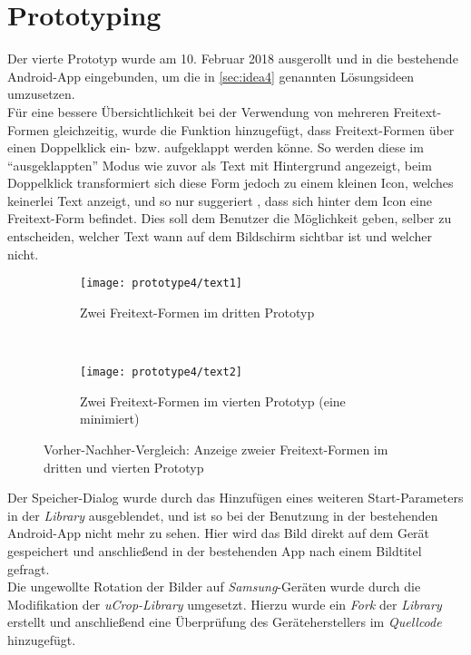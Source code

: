 \section{Prototyping}
Der vierte Prototyp wurde am 10. Februar 2018 ausgerollt und in die bestehende Android-App eingebunden, um die in \autoref{sec:idea4} genannten Lösungsideen umzusetzen. \\

Für eine bessere Übersichtlichkeit bei der Verwendung von mehreren Freitext-Formen gleichzeitig, wurde die Funktion hinzugefügt, dass Freitext-Formen über einen Doppelklick ein- bzw. aufgeklappt werden könne.
So werden diese im ``ausgeklappten'' Modus wie zuvor als Text mit Hintergrund angezeigt, beim Doppelklick transformiert sich diese Form jedoch zu einem kleinen Icon, welches keinerlei Text anzeigt, und so nur suggeriert , dass sich hinter dem Icon eine Freitext-Form befindet. 
Dies soll dem Benutzer die Möglichkeit geben, selber zu entscheiden, welcher Text wann auf dem Bildschirm sichtbar ist und welcher nicht. \\

\begin{figure}[h]
  \begin{subfigure}[t]{0.4\textwidth}
    \centering
    \texttt{[image: prototype4/text1]}
    \caption{Zwei Freitext-Formen im dritten Prototyp}
  \end{subfigure}
  ~
  \begin{subfigure}[t]{0.4\textwidth}
    \centering
    \texttt{[image: prototype4/text2]}
    \caption{Zwei Freitext-Formen im vierten Prototyp (eine minimiert)}
  \end{subfigure}
  \centering
  \caption{Vorher-Nachher-Vergleich: Anzeige zweier Freitext-Formen im dritten und vierten Prototyp}
  \label{fig:texts}
\end{figure}

Der Speicher-Dialog wurde durch das Hinzufügen eines weiteren Start-Parameters in der \emph{Library} ausgeblendet, und ist so bei der Benutzung in der bestehenden Android-App nicht mehr zu sehen.
Hier wird das Bild direkt auf dem Gerät gespeichert und anschließend in der bestehenden App nach einem Bildtitel gefragt. \\

Die ungewollte Rotation der Bilder auf \emph{Samsung}-Geräten wurde durch die Modifikation der \emph{uCrop-Library} umgesetzt.
Hierzu wurde ein \emph{Fork} der \emph{Library} erstellt und anschließend eine Überprüfung des Geräteherstellers im \emph{Quellcode} hinzugefügt.

